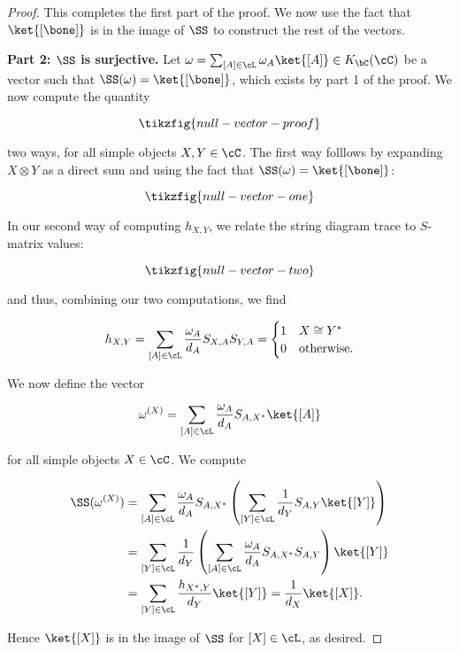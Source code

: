 \begin{proof}
This completes the first part of the proof. We now use the fact that $\ket{[\bone]}$ is in the image of $\SS$ to construct the rest of the vectors.

\textbf{Part 2: $\SS$ is surjective.} Let $\omega = \sum_{[A]\in \cL}\omega_{A}\ket{[A]}\in K_{\bC}(\cC)$ be a vector such that $\SS (\omega)= \ket{[\bone]}$, which exists by part 1 of the proof. We now compute the quantity

\begin{equation*}
\tikzfig{null-vector-proof}
\end{equation*}

two ways, for all simple objects $X,Y\in \cC$. The first way folllows by expanding $X\otimes Y$ as a direct sum and using the fact that $\SS(\omega)=\ket{[\bone]}$:

\begin{equation*}
\tikzfig{null-vector-one}
\end{equation*}

In our second way of computing $h_{X,Y}$, we relate the string diagram trace to $S$-matrix values:

\begin{equation*}
\tikzfig{null-vector-two}
\end{equation*}

and thus, combining our two computations, we find

$$h_{X,Y}=\sum_{[A]\in \cL}\frac{\omega_{A}}{d_A}S_{X,A}S_{Y,A}=
\begin{cases}
1 & X\cong Y^*\\
0 & \text{otherwise}.
\end{cases}$$

We now define the vector

$$\omega^{(X)}=\sum_{[A]\in \cL}\frac{\omega_{A}}{d_A}S_{A,X^*}\ket{[A]}$$

for all simple objects $X\in \cC$. We compute

\begin{align*}
\SS(\omega^{(X)}) &= \sum_{[A]\in\cL}\frac{\omega_{A}}{d_A}S_{A,X^*}\left(\sum_{[Y]\in \cL}\frac{1}{d_Y}S_{A,Y}\ket{[Y]}\right)\\
&=\sum_{[Y]\in \cL}\frac{1}{d_Y}\left(\sum_{[A]\in\cL}\frac{\omega_{A}}{d_A}S_{A,X^*}S_{A,Y}\right)\ket{[Y]}\\
&= \sum_{[Y]\in \cL}\frac{h_{X^*,Y}}{d_Y}\ket{[Y]}=\frac{1}{d_X}\ket{[X]}.
\end{align*}

Hence $\ket{[X]}$ is in the image of $\SS$ for $[X]\in \cL$, as desired.

\end{proof}


